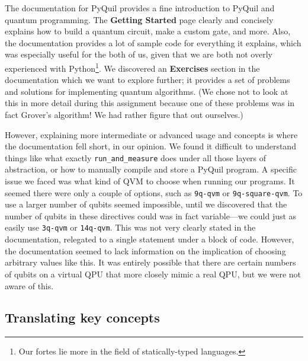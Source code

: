 \documentclass[12pt]{article}
\begin{document}
The documentation for PyQuil provides a fine introduction to PyQuil and quantum programming.
The \textbf{Getting Started} page clearly and concisely explains how to build a quantum circuit, make a custom gate, and more.
Also, the documentation provides a lot of sample code for everything it explains, which was especially useful for the both of us, given that we are both not overly experienced with Python\footnote{Our fortes lie more in the field of statically-typed languages.}.
We discovered an \textbf{Exercises} section in the documentation which we want to explore further; it provides a set of problems and solutions for implementing quantum algorithms. (We chose not to look at this in more detail during this assignment because one of these problems was in fact Grover's algorithm! We had rather figure that out ourselves.)

However, explaining more intermediate or advanced usage and concepts is where the documentation fell short, in our opinion.
We found it difficult to understand things like what exactly \texttt{run\_and\_measure} does under all those layers of abstraction, or how to manually compile and store a PyQuil program.
A specific issue we faced was what kind of QVM to choose when running our programs.
It seemed there were only a couple of options, such as \texttt{9q-qvm} or \texttt{9q-square-qvm}.
To use a larger number of qubits seemed impossible, until we discovered that the number of qubits in these directives could was in fact variable---we could just as easily use \texttt{3q-qvm} or \texttt{14q-qvm}.
This was not very clearly stated in the documentation, relegated to a single statement under a block of code.
However, the documentation seemed to lack information on the implication of choosing arbitrary values like this.
It was entirely possible that there are certain numbers of qubits on a virtual QPU that more closely mimic a real QPU, but we were not aware of this.

\subsection{Translating key concepts}
\end{document}
